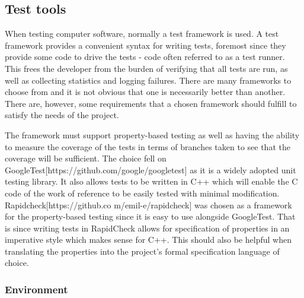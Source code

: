 \documentclass{article}
\begin{document}
\subsection{Test tools}\label{tests}

When testing computer software, normally a test framework is used. A test framework provides a convenient syntax for writing tests, foremost since they provide some code to drive the tests - code often referred to as a test runner. This frees the developer from the burden of verifying that all tests are run, as well as collecting statistics and logging failures. There are many frameworks to choose from and it is not obvious that one is necessarily better than another. There are, however, some requirements that a chosen framework should fulfill to satisfy the needs of the project.
 
The framework must support property-based testing as well as having the ability to measure the coverage of the tests in terms of branches taken to see that the coverage will be sufficient. The choice fell on GoogleTest[https://github.com/google/googletest] as it is a widely adopted unit testing library. It also allows tests to be written in C++ which will enable the C code of the work of reference to be easily tested with minimal modification. Rapidcheck[https://github.co
m/emil-e/rapidcheck] was chosen as a framework for the property-based testing since it is easy to use alongside GoogleTest. That is since writing tests in RapidCheck allows for specification of properties in an imperative style which makes sense for C++. This should also be helpful when translating the properties into the project's formal specification language of choice.

\subsubsection{Environment}\label{environment}
\end{document}
